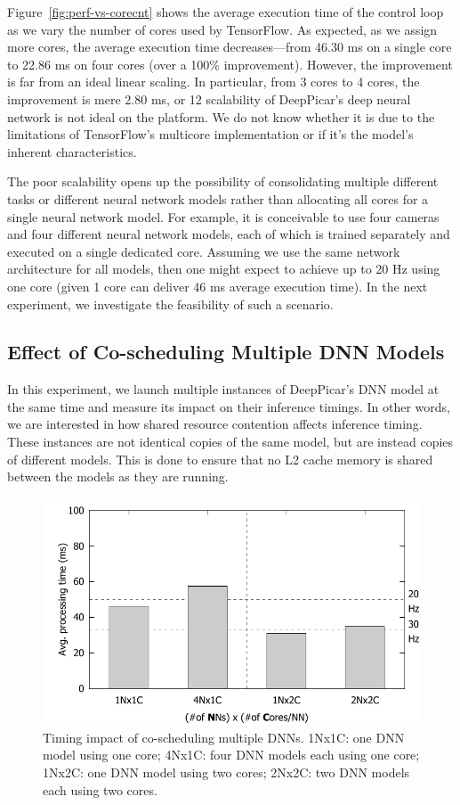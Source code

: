 Figure~\ref{fig:perf-vs-corecnt} shows the average execution time of
the control loop as we vary the number of cores used by
TensorFlow. As expected, as we assign more cores, the average execution
time decreases---from 46.30 ms on a single core to 22.86 ms on four
cores (over a 100\% improvement). However, the improvement is far from an ideal
linear scaling. In particular, from 3 cores to 4 cores, the
improvement is mere 2.80 ms, or 12%
scalability of DeepPicar's deep neural network is not ideal on the
platform. We do not know whether it is due to the limitations of
TensorFlow's multicore implementation or if it's the model's inherent
characteristics. 

The poor scalability opens up the possibility of consolidating
multiple different tasks or different neural network models rather
than allocating all cores for a single neural network model. For
example, it is conceivable to use four cameras and four different
neural network models, each of which is trained separately and
executed on a single dedicated core. Assuming we use the same network
architecture for all models, then one might expect to achieve up to
20 Hz using one core (given 1 core can deliver 46 ms average
execution time). In the next experiment, we investigate the
feasibility of such a scenario.

\subsection{Effect of Co-scheduling Multiple DNN Models}

In this experiment, we launch multiple instances of DeepPicar's DNN
model at the same time and measure its impact on their inference
timings. In other words, we are interested in how shared resource
contention affects inference timing. These instances are not identical
copies of the same model, but are instead copies of different models. 
This is done to ensure that no L2 cache memory is shared between the 
models as they are running.

\begin{figure}[h]
  \centering
  \includegraphics[width=.7\textwidth]{figs/perf_vs_modelcnt}
  \caption{Timing impact of co-scheduling multiple DNNs. 1Nx1C: one DNN
    model using one core; 4Nx1C: four DNN models each using one core;
    1Nx2C: one DNN model using two cores; 2Nx2C: two DNN models each
    using two cores.} 
  \label{fig:perf-vs-modelcnt}
\end{figure}

